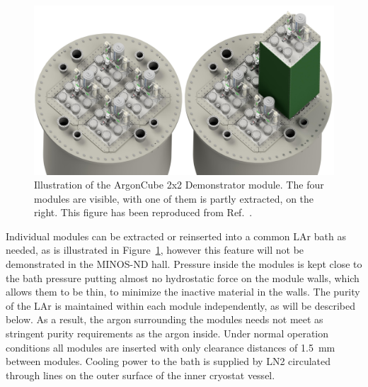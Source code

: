 \begin{figure}[htbp]
\centering
\includegraphics[width=\textwidth]{plots/BathAndModule}
\caption{Illustration of the ArgonCube 2x2 Demonstrator module. The four modules are visible, with one of them is partly extracted, on the right. This figure has been reproduced from Ref.~\cite{argoncube_loi}.}
\label{fig:2x2_extraction}
\end{figure}

Individual modules can be extracted or reinserted into a common LAr bath as needed, as is illustrated in Figure~\ref{fig:2x2_extraction}, however this feature will not be demonstrated in the MINOS-ND hall. Pressure inside the modules is kept close to the bath pressure putting almost no hydrostatic force on the module walls, which allows them to be thin, to minimize the inactive material in the walls. The purity of the LAr is maintained within each module independently, as will be described below. As a result, the argon surrounding the modules needs not meet as stringent purity requirements as the argon inside. Under normal operation conditions all modules are inserted with only clearance distances of \SI{1.5}{\milli\metre} between modules. Cooling power to the bath is supplied by LN2 circulated through lines on the outer surface of the inner cryostat vessel.


